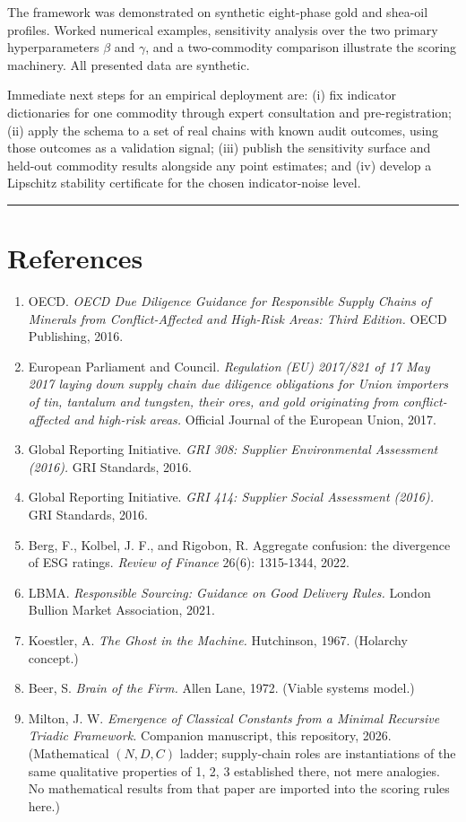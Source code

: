 \documentclass[12pt]{article}
\providecommand{\tightlist}{%
  \setlength{\itemsep}{0pt}\setlength{\parskip}{0pt}}
\begin{document}
The framework was demonstrated on synthetic eight-phase gold and
shea-oil profiles. Worked numerical examples, sensitivity analysis over
the two primary hyperparameters \(\beta\) and \(\gamma\), and a
two-commodity comparison illustrate the scoring machinery. All presented
data are synthetic.

Immediate next steps for an empirical deployment are: (i) fix indicator
dictionaries for one commodity through expert consultation and
pre-registration; (ii) apply the schema to a set of real chains with
known audit outcomes, using those outcomes as a validation signal; (iii)
publish the sensitivity surface and held-out commodity results alongside
any point estimates; and (iv) develop a Lipschitz stability certificate
for the chosen indicator-noise level.

\begin{center}\rule{0.5\linewidth}{0.5pt}\end{center}

\section{References}\label{references}

\begin{enumerate}
\def\labelenumi{\arabic{enumi}.}
\tightlist
\item
  OECD. \emph{OECD Due Diligence Guidance for Responsible Supply Chains
  of Minerals from Conflict-Affected and High-Risk Areas: Third
  Edition.} OECD Publishing, 2016.
\item
  European Parliament and Council. \emph{Regulation (EU) 2017/821 of 17
  May 2017 laying down supply chain due diligence obligations for Union
  importers of tin, tantalum and tungsten, their ores, and gold
  originating from conflict-affected and high-risk areas.} Official
  Journal of the European Union, 2017.
\item
  Global Reporting Initiative. \emph{GRI 308: Supplier Environmental
  Assessment (2016).} GRI Standards, 2016.
\item
  Global Reporting Initiative. \emph{GRI 414: Supplier Social Assessment
  (2016).} GRI Standards, 2016.
\item
  Berg, F., Kolbel, J. F., and Rigobon, R. Aggregate confusion: the
  divergence of ESG ratings. \emph{Review of Finance} 26(6): 1315-1344,
  2022.
\item
  LBMA. \emph{Responsible Sourcing: Guidance on Good Delivery Rules.}
  London Bullion Market Association, 2021.
\item
  Koestler, A. \emph{The Ghost in the Machine.} Hutchinson, 1967.
  (Holarchy concept.)
\item
  Beer, S. \emph{Brain of the Firm.} Allen Lane, 1972. (Viable systems
  model.)
\item
  Milton, J. W. \emph{Emergence of Classical Constants from a Minimal
  Recursive Triadic Framework.} Companion manuscript, this repository,
  2026. (Mathematical \((N,D,C)\) ladder; supply-chain roles are
  instantiations of the same qualitative properties of 1, 2, 3
  established there, not mere analogies. No mathematical results from
  that paper are imported into the scoring rules here.)
\end{enumerate}
\end{document}
